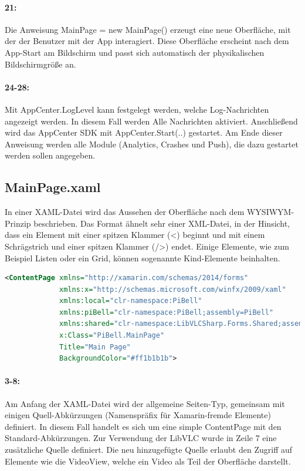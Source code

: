 \paragraph{21:} Die Anweisung MainPage = new MainPage() erzeugt eine neue Oberfläche, mit der der Benutzer mit der App interagiert. Diese Oberfläche erscheint nach dem App-Start am Bildschirm und passt sich automatisch der physikalischen Bildschirmgröße an.
\paragraph{24-28:} Mit AppCenter.LogLevel kann festgelegt werden, welche Log-Nachrichten angezeigt werden. In diesem Fall werden Alle Nachrichten aktiviert.
Anschließend wird das AppCenter SDK mit AppCenter.Start(..) gestartet. Am Ende dieser Anweisung werden alle Module (Analytics, Crashes und Push), die dazu gestartet werden sollen angegeben.

\subsection{MainPage.xaml}
In einer XAML-Datei wird das Aussehen der Oberfläche nach dem WYSIWYM-Prinzip beschrieben. Das Format ähnelt sehr einer XML-Datei, in der Hinsicht, dass ein Element mit einer spitzen Klammer (<) beginnt und mit einem Schrägstrich und einer spitzen Klammer (/>) endet. Einige Elemente, wie zum Beispiel Listen oder ein Grid, können sogenannte Kind-Elemente beinhalten.
\begin{lstlisting}[firstnumber=3,language=xml]
<ContentPage xmlns="http://xamarin.com/schemas/2014/forms"
             xmlns:x="http://schemas.microsoft.com/winfx/2009/xaml"
             xmlns:local="clr-namespace:PiBell"
             xmlns:piBell="clr-namespace:PiBell;assembly=PiBell"
             xmlns:shared="clr-namespace:LibVLCSharp.Forms.Shared;assembly=LibVLCSharp.Forms"
             x:Class="PiBell.MainPage"
             Title="Main Page"
             BackgroundColor="#ff1b1b1b">
\end{lstlisting}
\paragraph{3-8:} Am Anfang der XAML-Datei wird der allgemeine Seiten-Typ, gemeinsam mit einigen Quell-Abkürzungen (Namenspräfix für Xamarin-fremde Elemente) definiert. In diesem Fall handelt es sich um eine simple ContentPage mit den Standard-Abkürzungen. Zur Verwendung der LibVLC wurde in Zeile 7 eine zusätzliche Quelle definiert. Die neu hinzugefügte Quelle erlaubt den Zugriff auf Elemente wie die VideoView, welche ein Video als Teil der Oberfläche darstellt.
